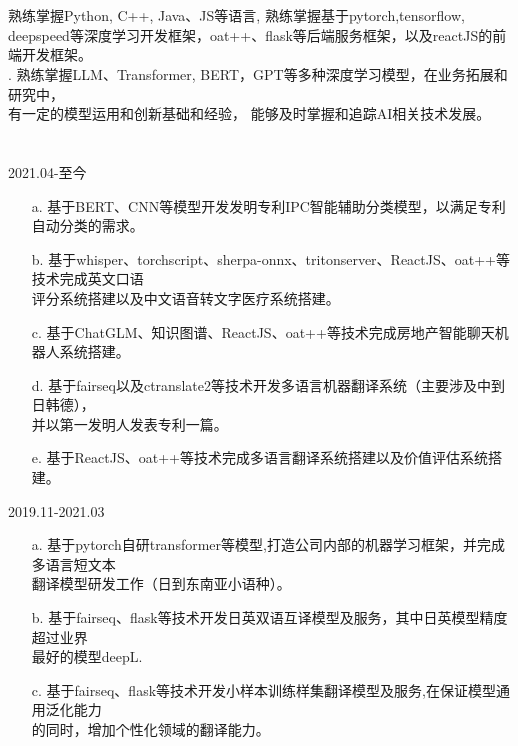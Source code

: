 \documentclass[margin]{res}
\begin{document}
\begin{resume}
\section{ }
            {} 熟练掌握Python, C++, Java、JS等语言, 熟练掌握基于pytorch,tensorflow, deepspeed等深度学习开发框架，oat++、flask等后端服务框架，以及reactJS的前端开发框架。 \\
            {} . 熟练掌握LLM、Transformer, BERT，GPT等多种深度学习模型，在业务拓展和研究中，\\有一定的模型运用和创新基础和经验， 能够及时掌握和追踪AI相关技术发展。\\

\section{} 
                { }  \hfill 2021.04-至今
                \begin{itemize}  \itemsep -2pt %
                \item[a.] 基于BERT、CNN等模型开发发明专利IPC智能辅助分类模型，以满足专利自动分类的需求。
                \item[b.] 基于whisper、torchscript、sherpa-onnx、tritonserver、ReactJS、oat++等技术完成英文口语\\评分系统搭建以及中文语音转文字医疗系统搭建。 
                \item[c.] 基于ChatGLM、知识图谱、ReactJS、oat++等技术完成房地产智能聊天机器人系统搭建。
                \item[d.] 基于fairseq以及ctranslate2等技术开发多语言机器翻译系统（主要涉及中到日韩德），\\并以第一发明人发表专利一篇。
                \item[e.] 基于ReactJS、oat++等技术完成多语言翻译系统搭建以及价值评估系统搭建。 
                 
                \end{itemize}
                { }  \hfill 2019.11-2021.03
                 \begin{itemize}  \itemsep -2pt %
                 \item[a.] 基于pytorch自研transformer等模型,打造公司内部的机器学习框架，并完成多语言短文本\\翻译模型研发工作（日到东南亚小语种）。
                \item[b.]  基于fairseq、flask等技术开发日英双语互译模型及服务，其中日英模型精度超过业界\\最好的模型deepL.
                \item[c.] 基于fairseq、flask等技术开发小样本训练样集翻译模型及服务,在保证模型通用泛化能力\\的同时，增加个性化领域的翻译能力。
                

\end{itemize}
\end{resume}
\end{document}
